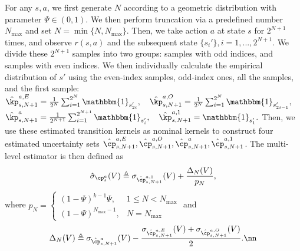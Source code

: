 For any $s,a$, we first generate $N$ according to a geometric distribution with parameter $\Psi\in(0,1)$. We then perform truncation via a predefined number $N_{\max}$ and set $N = \min\{N,N_{\max}\}$. Then, we take action $a$ at state $s$ for $2^{N+1}$ times, and observe $r(s,a)$ and the subsequent state $\{s_i'\}, i=1,...,2^{N+1}$. We divide these $2^{N+1}$ samples into two groups:  samples with odd indices, and samples with even indices. We then individually calculate the empirical distribution of $s'$ using the even-index samples, odd-index ones, all the samples, and the first sample:
$\hat{\kp}^{a,E}_{s,N+1}= \frac{1}{2^{N}}\sum_{i=1}^{2^{N}}\mathbbm{1}_{s_{2i}'},  
\quad\hat{\kp}^{a,O}_{s,N+1}= \frac{1}{2^{N}}\sum_{i=1}^{2^{N}}\mathbbm{1}_{s_{2i-1}'},$
$\hat{\kp}^{a}_{s,N+1}= \frac{1}{2^{N+1}}\sum_{i=1}^{2^{N+1}}\mathbbm{1}_{s_i'},\quad\hat{\kp}^{a,1}_{s,N+1}= \mathbbm{1}_{s_1'}.
$
Then, we use these estimated transition kernels as nominal kernels to construct four estimated uncertainty sets $\hat{\cp}^{a,E}_{s,N+1},\hat{\cp}^{a,O}_{s,N+1},\hat{\cp}^{a}_{s,N+1},\hat{\cp}^{a,1}_{s,N+1}$. The multi-level estimator is then defined as 
\begin{align}\label{eq:est1}
    \hat{\sigma}_{\cp^a_s}(V)\triangleq \sigma_{\hat{\cp}^{a,1}_{s,N+1}}(V)+\frac{\Delta_N(V)}{p_N},
\end{align}
where  $p_N=
\begin{cases}
(1 - \Psi)^{k-1} \Psi, & 1 \leq N < N_{\max} \\
(1 - \Psi)^{N_{\max} - 1}, & N = N_{\max}
\end{cases}$ and
\begin{align}
    \Delta_N(V)\triangleq \sigma_{\hat{\cp}^{a}_{s,N+1}}(V)-\frac{\sigma_{\hat{\cp}^{a,E}_{s,N+1}}(V)+\sigma_{\hat{\cp}^{a,O}_{s,N+1}}(V)}{2}.\nn
\end{align}



